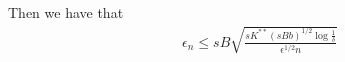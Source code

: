 Then we have that
\begin{align*}
\epsilon_n \leq sB \sqrt{ \frac{ sK^{**} (sBb)^{1/2} \log \frac{1}{\delta}}{\epsilon^{1/2}n}}
\end{align*}











